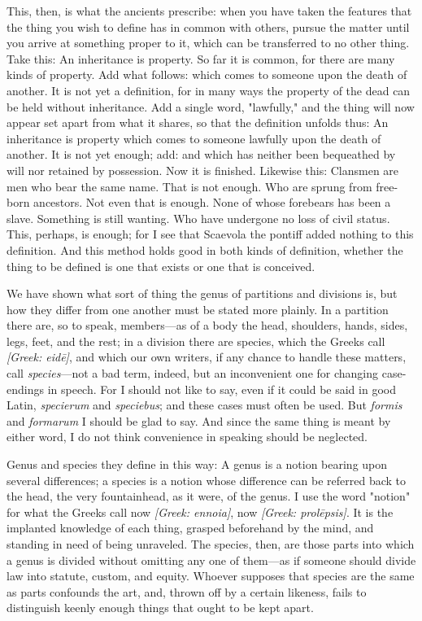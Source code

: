  This, then, is what the ancients prescribe: when you have taken the features that the thing you wish to define has in common with others, pursue the matter until you arrive at something proper to it, which can be transferred to no other thing. Take this: An inheritance is property. So far it is common, for there are many kinds of property. Add what follows: which comes to someone upon the death of another. It is not yet a definition, for in many ways the property of the dead can be held without inheritance. Add a single word, "lawfully," and the thing will now appear set apart from what it shares, so that the definition unfolds thus: An inheritance is property which comes to someone lawfully upon the death of another. It is not yet enough; add: and which has neither been bequeathed by will nor retained by possession. Now it is finished. Likewise this: Clansmen are men who bear the same name. That is not enough. Who are sprung from free-born ancestors. Not even that is enough. None of whose forebears has been a slave. Something is still wanting. Who have undergone no loss of civil status. This, perhaps, is enough; for I see that Scaevola the pontiff added nothing to this definition. And this method holds good in both kinds of definition, whether the thing to be defined is one that exists or one that is conceived.

 We have shown what sort of thing the genus of partitions and divisions is, but how they differ from one another must be stated more plainly. In a partition there are, so to speak, members—as of a body the head, shoulders, hands, sides, legs, feet, and the rest; in a division there are species, which the Greeks call \textit{[Greek: eidē]}, and which our own writers, if any chance to handle these matters, call \textit{species}—not a bad term, indeed, but an inconvenient one for changing case-endings in speech. For I should not like to say, even if it could be said in good Latin, \textit{specierum} and \textit{speciebus}; and these cases must often be used. But \textit{formis} and \textit{formarum} I should be glad to say. And since the same thing is meant by either word, I do not think convenience in speaking should be neglected.

 Genus and species they define in this way: A genus is a notion bearing upon several differences; a species is a notion whose difference can be referred back to the head, the very fountainhead, as it were, of the genus. I use the word "notion" for what the Greeks call now \textit{[Greek: ennoia]}, now \textit{[Greek: prolēpsis]}. It is the implanted knowledge of each thing, grasped beforehand by the mind, and standing in need of being unraveled. The species, then, are those parts into which a genus is divided without omitting any one of them—as if someone should divide law into statute, custom, and equity. Whoever supposes that species are the same as parts confounds the art, and, thrown off by a certain likeness, fails to distinguish keenly enough things that ought to be kept apart.

